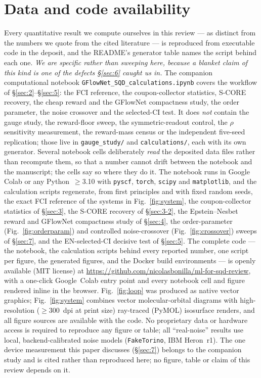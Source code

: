 \documentclass[onecolumn,a4paper]{quantumarticle}
\begin{document}
\section*{Data and code availability}
\small
Every quantitative result we compute ourselves in this review --- as distinct from the numbers we quote from the cited literature --- is reproduced from executable code in the deposit, and the README's generator table names the script behind each one. \emph{We are specific rather than sweeping here, because a blanket claim of this kind is one of the defects \S\ref{sec:6} caught us in.} The companion computational notebook \texttt{GFlowNet\_SQD\_calculations.ipynb} covers the workflow of \S\ref{sec:2}--\S\ref{sec:5}: the FCI reference, the coupon-collector statistics, S-CORE recovery, the cheap reward and the GFlowNet compactness study, the order parameter, the noise crossover and the selected-CI test. It does \emph{not} contain the gauge study, the reward-floor sweep, the symmetric-readout control, the $\rho$ sensitivity measurement, the reward-mass census or the independent five-seed replication; those live in \texttt{gauge\_study/} and \texttt{calculations/}, each with its own generator. Several notebook cells deliberately \emph{read} the deposited data files rather than recompute them, so that a number cannot drift between the notebook and the manuscript; the cells say so where they do it. The notebook runs in Google Colab or any Python~$\ge$3.10 with \texttt{pyscf}, \texttt{torch}, \texttt{scipy} and \texttt{matplotlib}, and the calculation scripts regenerate, from first
principles and with fixed random seeds, the exact FCI reference of the systems in Fig.~\ref{fig:system}, the coupon-collector
statistics of \S\ref{sec:3}, the S-CORE recovery of \S\ref{sec:3-2}, the Epstein--Nesbet reward and GFlowNet compactness study of
\S\ref{sec:4}, the order-parameter (Fig.~\ref{fig:orderparam}) and controlled noise-crossover (Fig.~\ref{fig:crossover}) sweeps of \S\ref{sec:7}, and the EN-selected-CI decisive test of \S\ref{sec:5}. The complete code --- the notebook,
the calculation scripts behind every reported number, one script per figure, the generated figures, and the
Docker build environments --- is openly available (MIT license) at \url{https://github.com/nicolasbonilla/ml-for-sqd-review},
with a one-click Google~Colab entry point and every notebook cell and figure rendered inline in the browser.
Fig.~\ref{fig:loop} was produced as native vector graphics; Fig.~\ref{fig:system} combines vector molecular-orbital diagrams with high-resolution ($\ge$300~dpi at print size) ray-traced (PyMOL) isosurface renders, and all figure sources are available with the code. No proprietary data or
hardware access is required to reproduce any figure or table; all ``real-noise'' results use local,
backend-calibrated noise models (\texttt{FakeTorino}, IBM Heron~r1). The one device measurement
this paper discusses (\S\ref{sec:7}) belongs to the companion study \cite{bonilla2026spectral} and is
cited rather than reproduced here; no figure, table or claim of this review depends on it.
\end{document}
